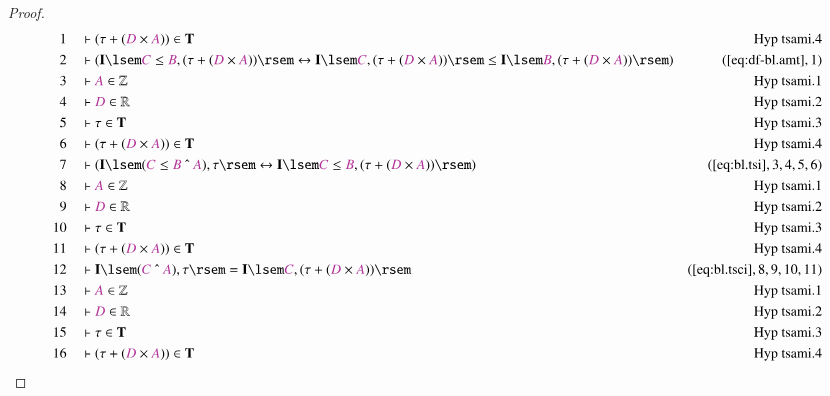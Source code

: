 \begin{proof}
\begin{align}
  1 &&  & \vdash ( \tau + ( \mc{D} \times \mc{A} ) ) \in
      \mathbf{T}&\text{Hyp~tsami.4}\notag%
  \\ 2 &&  & \vdash ( \mathbf{I} \lsem \mc{C} \le \mc{B} , ( \tau + ( \mc{D}
      \times \mc{A} ) ) \rsem \leftrightarrow \mathbf{I}
      \lsem \mc{C} , ( \tau + ( \mc{D} \times \mc{A} ) )
      \rsem \le \mathbf{I} \lsem \mc{B} , ( \tau + ( \mc{D}
      \times \mc{A} ) ) \rsem
      )&(\mbox{\ref{eq:df-bl.amt}},1)\notag
  \\ 3 &&  & \vdash \mc{A} \in \mathbb{Z}&\text{Hyp~tsami.1}\notag%
  \\ 4 &&  & \vdash \mc{D} \in \mathbb{R}&\text{Hyp~tsami.2}\notag%
  \\ 5 &&  & \vdash \tau \in \mathbf{T}&\text{Hyp~tsami.3}\notag%
  \\ 6 &&  & \vdash ( \tau + ( \mc{D} \times \mc{A} ) ) \in
      \mathbf{T}&\text{Hyp~tsami.4}\notag%
  \\ 7 &&  & \vdash ( \mathbf{I} \lsem ( \mc{C} \le \mc{B} ~\string^~ \mc{A} )
      , \tau \rsem \leftrightarrow \mathbf{I} \lsem \mc{C}
      \le \mc{B} , ( \tau + ( \mc{D} \times \mc{A} ) ) \rsem
      )&(\mbox{\ref{eq:bl.tsi}},3,4,5,6)\notag
  \\ 8 &&  & \vdash \mc{A} \in \mathbb{Z}&\text{Hyp~tsami.1}\notag%
  \\ 9 &&  & \vdash \mc{D} \in \mathbb{R}&\text{Hyp~tsami.2}\notag%
  \\ 10 &&  & \vdash \tau \in \mathbf{T}&\text{Hyp~tsami.3}\notag%
  \\ 11 &&  & \vdash ( \tau + ( \mc{D} \times \mc{A} ) ) \in
      \mathbf{T}&\text{Hyp~tsami.4}\notag%
  \\ 12 &&  & \vdash \mathbf{I} \lsem ( \mc{C} ~\string^~ \mc{A} ) , \tau \rsem
      = \mathbf{I} \lsem \mc{C} , ( \tau + ( \mc{D} \times
      \mc{A} ) )
      \rsem&(\mbox{\ref{eq:bl.tsci}},8,9,10,11)\notag
  \\ 13 &&  & \vdash \mc{A} \in \mathbb{Z}&\text{Hyp~tsami.1}\notag%
  \\ 14 &&  & \vdash \mc{D} \in \mathbb{R}&\text{Hyp~tsami.2}\notag%
  \\ 15 &&  & \vdash \tau \in \mathbf{T}&\text{Hyp~tsami.3}\notag%
  \\ 16 &&  & \vdash ( \tau + ( \mc{D} \times \mc{A} ) ) \in
      \mathbf{T}&\text{Hyp~tsami.4}\notag%

\end{align}
\end{proof}

